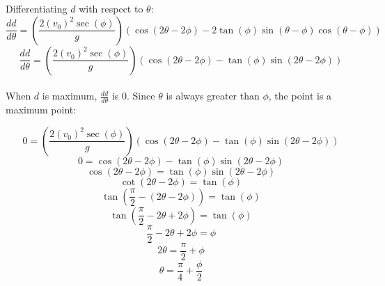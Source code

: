 \documentclass[11pt]{article}
\begin{document}
\newpage

Differentiating \(d\) with respect to \(\theta\):
\[\frac{dd}{d\theta} = \left( \frac{2(v_0)^2 \sec(\phi)}{g}\right) (\cos(2\theta - 2\phi) - 2\tan(\phi) \sin(\theta - \phi) \cos(\theta - \phi))\]
\[\frac{dd}{d\theta} = \left( \frac{2(v_0)^2 \sec(\phi)}{g}\right) (\cos(2\theta - 2\phi) - \tan(\phi) \sin(2\theta - 2\phi))\]
\\[0pt]

When \(d\) is maximum, \(\frac{dd}{d\theta}\) is 0. Since \(\theta\) is always greater than \(\phi\), the point is a maximum point:

\[0 = \left(\frac{2(v_0)^2 \sec(\phi)}{g}\right) (\cos(2\theta - 2\phi) - \tan(\phi) \sin(2\theta - 2\phi))\]
\[0 = \cos(2\theta - 2\phi) - \tan(\phi) \sin(2\theta - 2\phi)\]
\[\cos(2\theta - 2\phi) = \tan(\phi) \sin(2\theta - 2\phi)\]
\[\cot(2\theta - 2\phi) = \tan(\phi)\]
\[\tan \left(\frac{\pi}{2} - (2\theta - 2\phi)\right) = \tan(\phi)\]
\[\tan \left(\frac{\pi}{2} - 2\theta + 2\phi \right) = \tan(\phi)\]
\[\frac{\pi}{2} - 2\theta + 2\phi = \phi\]
\[2\theta = \frac{\pi}{2} + \phi\]
\[\theta = \frac{\pi}{4} + \frac{\phi}{2}\]
\end{document}
